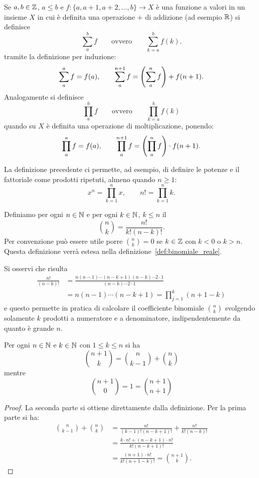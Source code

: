\begin{definition}
Se $a,b\in \mathbb Z$, $a\le b$ e $f\colon \{a, a+1, a+2, \dots, b\}\to X$
è una funzione a valori in un insieme $X$ in cui è definita una
operazione $+$ di addizione (ad esempio $\mathbb R$)
si definisce
\[
  \sum_a^b f
  \qquad \text{ovvero} \qquad
  \sum_{k=a}^b f(k).
\]
tramite la definizione per induzione:
\[
    \displaystyle \sum_a^a f = f(a), \qquad
    \displaystyle \sum_{a}^{n+1} f = {\left( \sum_a^n f \right)} + f(n+1).
\]
Analogamente si definisce
\[
  \prod_a^b f
  \qquad\text{ovvero}\qquad
  \prod_{k=a}^b f(k)
\]
quando su $X$ è definita una operazione di moltiplicazione,
ponendo:
\[
    \displaystyle \prod_{a}^a f = f(a), \qquad
    \displaystyle \prod_{a}^{n+1} f = {\left( \prod_a^n f \right)} \cdot f(n+1).
\]
\end{definition}

La definizione precedente ci permette, ad esempio, di definire le potenze e il fattoriale
come prodotti ripetuti, almeno quando $n\ge 1$:
\[
  x^n = \prod_{k=1}^n x, \qquad
  n! = \prod_{k=1}^n k.
\]

\begin{definition}
\label{def:binomiale}
\mymark{***}
Definiamo per ogni $n\in \mathbb N$ e per ogni $k\in \mathbb N$, $k\le n$
il 
\[
{n \choose k}
=\frac{n!}{k!(n-k)!}.
\]
Per convenzione può essere utile porre
${n \choose k}=0$ se $k\in \mathbb Z$ con $k< 0$ o $k>n$.
Questa definizione verrà estesa nella definizione~\ref{def:binomiale_reale}.
\end{definition}
%
Si osservi che risulta
\begin{align*}
\frac{n!}{(n-k)!} &= \frac{n (n-1) \cdots (n-k+1)(n-k) \cdots 2\cdot 1}{(n-k) \cdots 2\cdot 1}\\
 &= n (n-1) \cdots (n-k+1) = \prod_{j=1}^k (n+1-k)
\end{align*}
e questo permette in pratica di calcolare il coefficiente binomiale ${n \choose k}$
svolgendo solamente $k$ prodotti a numeratore e a denominatore, indipendentemente
da quanto è grande $n$.

\begin{theorem}
\mymark{*}
Per ogni $n\in \mathbb N$ e $k \in \mathbb N$ con $1 \le k \le n$ si ha
\[
  {n+1 \choose k} =
      {n \choose k-1} + {n \choose k}
\]
mentre
\[
  {n+1 \choose 0} = 1 = {n+1 \choose n+1}
\]
\end{theorem}
%
\begin{proof}
La seconda parte si ottiene direttamente dalla definizione.
Per la prima parte si ha:
\begin{align*}
{n \choose k-1} + {n \choose k}
&= \frac{n!}{(k-1)!(n-k+1)!} + \frac{n!}{k!(n-k)!} \\
&= \frac{k\cdot n! + (n-k+1)\cdot n!}{k!(n-k+1)!} \\
&= \frac{(n+1)\cdot n!}{k!(n+1-k)!}
= {n+1 \choose k}.
\end{align*}
\end{proof}

